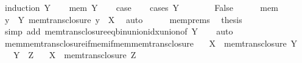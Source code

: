 \begin{isabellebody}
%
\isadelimproof
%
\endisadelimproof
%
\isatagproof
{}\isamarkupfalse%
\ {\isacharparenleft}{\kern0pt}induction\ Y{\isacharparenright}{\kern0pt}\isanewline
\ \ \isamarkupfalse%
\ {\isacharparenleft}{\kern0pt}mem\ Y{\isacharparenright}{\kern0pt}\isanewline
\ \ \isamarkupfalse%
\ {\isacharquery}{\kern0pt}case\isanewline
\ \ \isamarkupfalse%
\ {\isacharparenleft}{\kern0pt}cases\ {\isachardoublequoteopen}Y\ {\isacharequal}{\kern0pt}\ {\isacharbraceleft}{\kern0pt}{\isacharbraceright}{\kern0pt}{\isachardoublequoteclose}{\isacharparenright}{\kern0pt}\isanewline
\ \ \ \ \isamarkupfalse%
\ False\isanewline
\ \ \ \ \isamarkupfalse%
\ mem\ \isamarkupfalse%
\ {\isachardoublequoteopen}{\isacharparenleft}{\kern0pt}{\isasymUnion}y\ {\isasymin}\ Y{\isachardot}{\kern0pt}\ mem{\isacharunderscore}{\kern0pt}trans{\isacharunderscore}{\kern0pt}closure\ y{\isacharparenright}{\kern0pt}\ {\isasymle}\ X{\isachardoublequoteclose}\ \isamarkupfalse%
\ auto\isanewline
\ \ \ \ \isamarkupfalse%
\ mem{\isachardot}{\kern0pt}prems\ \isamarkupfalse%
\ {\isacharquery}{\kern0pt}thesis\ \isamarkupfalse%
\ {\isacharparenleft}{\kern0pt}simp\ add{\isacharcolon}{\kern0pt}\ mem{\isacharunderscore}{\kern0pt}trans{\isacharunderscore}{\kern0pt}closure{\isacharunderscore}{\kern0pt}eq{\isacharunderscore}{\kern0pt}bin{\isacharunderscore}{\kern0pt}union{\isacharunderscore}{\kern0pt}idx{\isacharunderscore}{\kern0pt}union{\isacharbrackleft}{\kern0pt}of\ Y{\isacharbrackright}{\kern0pt}{\isacharparenright}{\kern0pt}\isanewline
\ \ \isamarkupfalse%
\ auto\isanewline
{}\isamarkupfalse%
%
\endisatagproof
{\isafoldproof}%
%
\isadelimproof
\isanewline
%
\endisadelimproof
\isanewline
{}\isamarkupfalse%
\ mem{\isacharunderscore}{\kern0pt}mem{\isacharunderscore}{\kern0pt}trans{\isacharunderscore}{\kern0pt}closure{\isacharunderscore}{\kern0pt}if{\isacharunderscore}{\kern0pt}mem{\isacharunderscore}{\kern0pt}if{\isacharunderscore}{\kern0pt}mem{\isacharunderscore}{\kern0pt}mem{\isacharunderscore}{\kern0pt}trans{\isacharunderscore}{\kern0pt}closure{\isacharcolon}{\kern0pt}\isanewline
\ \ \ {\isachardoublequoteopen}X\ {\isasymin}\ mem{\isacharunderscore}{\kern0pt}trans{\isacharunderscore}{\kern0pt}closure\ Y{\isachardoublequoteclose}\isanewline
\ \ \ {\isachardoublequoteopen}Y\ {\isasymin}\ Z{\isachardoublequoteclose}\isanewline
\ \ \ {\isachardoublequoteopen}X\ {\isasymin}\ mem{\isacharunderscore}{\kern0pt}trans{\isacharunderscore}{\kern0pt}closure\ Z{\isachardoublequoteclose}\isanewline

\end{isabellebody}
